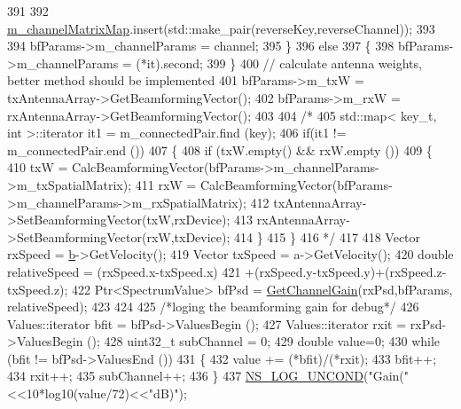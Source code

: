 \begin{DoxyCode}
391 
392                 \hyperlink{classns3_1_1MmWaveChannelMatrix_ad505ccb88c10f493fbba01d12732241f}{m\_channelMatrixMap}.insert(std::make\_pair(reverseKey,reverseChannel));
393 
394                 bfParams->m\_channelParams = channel;
395         \}
396         \textcolor{keywordflow}{else}
397         \{
398                 bfParams->m\_channelParams = (*it).second;
399         \}
400         \textcolor{comment}{//      calculate antenna weights, better method should be implemented}
401         bfParams->m\_txW = txAntennaArray->GetBeamformingVector();
402         bfParams->m\_rxW = rxAntennaArray->GetBeamformingVector();
403 
404         \textcolor{comment}{/*}
405 \textcolor{comment}{        std::map< key\_t, int >::iterator it1 = m\_connectedPair.find (key);}
406 \textcolor{comment}{        if(it1 != m\_connectedPair.end ())}
407 \textcolor{comment}{        \{}
408 \textcolor{comment}{                if (txW.empty() && rxW.empty ())}
409 \textcolor{comment}{                \{}
410 \textcolor{comment}{                        txW = CalcBeamformingVector(bfParams->m\_channelParams->m\_txSpatialMatrix);}
411 \textcolor{comment}{                        rxW = CalcBeamformingVector(bfParams->m\_channelParams->m\_rxSpatialMatrix);}
412 \textcolor{comment}{                        txAntennaArray->SetBeamformingVector(txW,rxDevice);}
413 \textcolor{comment}{                        rxAntennaArray->SetBeamformingVector(rxW,txDevice);}
414 \textcolor{comment}{                \}}
415 \textcolor{comment}{        \}}
416 \textcolor{comment}{        */}
417 
418         Vector rxSpeed = \hyperlink{buildings__pathloss_8m_a21ad0bd836b90d08f4cf640b4c298e7c}{b}->GetVelocity();
419         Vector txSpeed = a->GetVelocity();
420         \textcolor{keywordtype}{double} relativeSpeed = (rxSpeed.x-txSpeed.x)
421                         +(rxSpeed.y-txSpeed.y)+(rxSpeed.z-txSpeed.z);
422         Ptr<SpectrumValue> bfPsd = \hyperlink{classns3_1_1MmWaveChannelMatrix_a1c744518b5c26b1169cfc003c9662ee3}{GetChannelGain}(rxPsd,bfParams, relativeSpeed);
423 
424 
425         \textcolor{comment}{/*loging the beamforming gain for debug*/}
426         Values::iterator bfit = bfPsd->ValuesBegin ();
427         Values::iterator rxit = rxPsd->ValuesBegin ();
428         uint32\_t subChannel = 0;
429         \textcolor{keywordtype}{double} value=0;
430         \textcolor{keywordflow}{while} (bfit != bfPsd->ValuesEnd ())
431         \{
432                 value += (*bfit)/(*rxit);
433                 bfit++;
434                 rxit++;
435                 subChannel++;
436         \}
437         \hyperlink{log-macros-disabled_8h_a0b36e5e182b37194f85ef1c5e979fb2e}{NS\_LOG\_UNCOND}(\textcolor{stringliteral}{"Gain("}<<10*log10(value/72)<<\textcolor{stringliteral}{"dB)"});

\end{DoxyCode}
